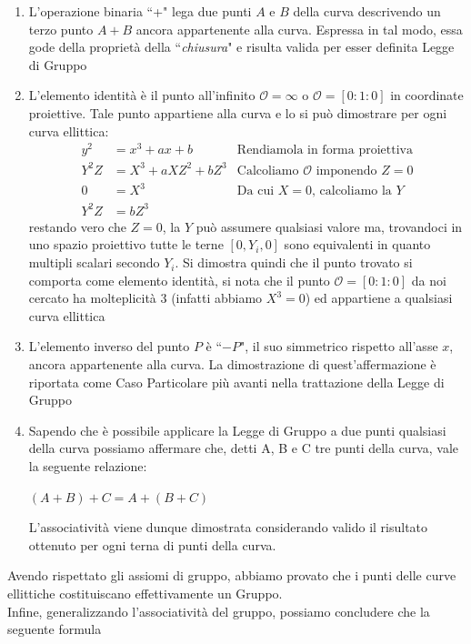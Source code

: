 \documentclass[a4paper,12pt]{tesiinfo}
\begin{document}
\begin{enumerate}
%
 \item L'operazione binaria ``+" lega due punti $A$ e $B$ della curva descrivendo un terzo punto $A+B$ ancora appartenente alla curva. Espressa in tal modo, essa gode della propriet\`a della ``\textit{chiusura}" e risulta valida per esser definita Legge di Gruppo
 \item L'elemento identit\`a \`e il punto all'infinito $\mathcal{O} = \infty$ o $\mathcal{O} = [0:1:0]$ in coordinate proiettive. Tale punto appartiene alla curva e lo si pu\`o dimostrare \cite{Wolfram} per ogni curva ellittica:
 \begin{align*}
    y^2 &= x^3 + ax + b &\text{Rendiamola in forma proiettiva}\\
    Y^2Z &= X^3 + aXZ^2 + bZ^3 &\text{Calcoliamo $\mathcal{O}$ imponendo }Z=0\\
    0 &= X^3 &\text{Da cui }X=0\text{, calcoliamo la }Y\\
    Y^2Z &= bZ^3
 \end{align*}
 restando vero che $Z=0$, la $Y$ pu\`o assumere qualsiasi valore ma, trovandoci in uno spazio proiettivo tutte le terne $[0, Y_i, 0]$ sono equivalenti in quanto multipli scalari secondo $Y_i$. Si dimostra quindi che il punto trovato si comporta come elemento identit\`a, si nota che il punto $\mathcal{O} = [0:1:0]$ da noi cercato ha molteplicit\`a 3 (infatti abbiamo $X^3=0$) ed appartiene a qualsiasi curva ellittica
 \item L'elemento inverso del punto $P$ \`e ``$-P$", il suo simmetrico rispetto all'asse $x$, ancora appartenente alla curva. La dimostrazione di quest'affermazione \`e riportata come Caso Particolare pi\`u avanti nella trattazione della Legge di Gruppo
 \item Sapendo che \`e possibile applicare la Legge di Gruppo a due punti qualsiasi della curva possiamo affermare che, detti A, B e C tre punti della curva, vale la seguente relazione:
 \begin{center}
 $(A+B)+C=A+(B+C)$
 \end{center}
L'associativit\`a viene dunque dimostrata considerando valido il risultato ottenuto per ogni terna di punti della curva.
\end{enumerate}
Avendo rispettato gli assiomi di gruppo, abbiamo provato che i punti delle curve ellittiche costituiscano effettivamente un Gruppo.
\\
Infine, generalizzando l'associativit\`a del gruppo, possiamo concludere che la seguente formula
\end{document}

